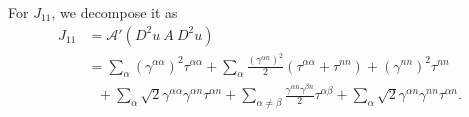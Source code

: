 \documentclass[12pt]{article}
\numberwithin{equation}{section}
\theoremstyle{plain}
\theoremstyle{definition}
\theoremstyle{remark}
\begin{document}
For $J_{11}$, we decompose it as
\begin{equation} \label{eq:neuJ1_1}
\begin{split}
    J_{11} & = \mathcal{A}' (D^2 u \  A \  D^2 u) \\ & = \sum_{\alpha} (\gamma^{\alpha \alpha})^2 \tau^{\alpha \alpha} + \sum_{\alpha} \frac{(\gamma^{\alpha n})^2}{2} (\tau^{\alpha \alpha} + \tau^{n n}) + (\gamma^{n n})^2 \tau^{n n} \\
    & \ \ \ + \sum_{\alpha} \sqrt{2} \gamma^{\alpha \alpha} \gamma^{\alpha n} \tau^{\alpha n} + \sum_{\alpha \neq \beta} \frac{\gamma^{\alpha n} \gamma^{\beta n}}{2} \tau^{\alpha \beta} + \sum_{\alpha} \sqrt{2} \gamma^{\alpha n} \gamma^{n n} \tau^{\alpha n}.
\end{split}
\end{equation}
\end{document}
